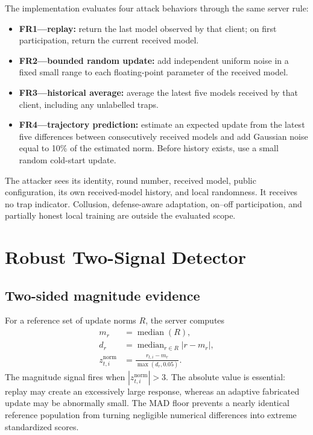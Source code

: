 The implementation evaluates four attack behaviors through the same server rule:
\begin{itemize}
    \item \textbf{FR1---replay:} return the last model observed by that client; on first participation, return the current received model.
    \item \textbf{FR2---bounded random update:} add independent uniform noise in a fixed small range to each floating-point parameter of the received model.
    \item \textbf{FR3---historical average:} average the latest five models received by that client, including any unlabelled traps.
    \item \textbf{FR4---trajectory prediction:} estimate an expected update from the latest five differences between consecutively received models and add Gaussian noise equal to 10\% of the estimated norm. Before history exists, use a small random cold-start update.
\end{itemize}
The attacker sees its identity, round number, received model, public configuration, its own received-model history, and local randomness. It receives no trap indicator. Collusion, defense-aware adaptation, on--off participation, and partially honest local training are outside the evaluated scope.

\section{Robust Two-Signal Detector}

\subsection{Two-sided magnitude evidence}
For a reference set of update norms $R$, the server computes
\begin{align}
m_r &= \operatorname{median}(R),\\
d_r &= \operatorname{median}_{r\in R}|r-m_r|,\\
z^{\mathrm{norm}}_{t,i} &= \frac{r_{t,i}-m_r}{\max(d_r,0.05)}.
\end{align}
The magnitude signal fires when $|z^{\mathrm{norm}}_{t,i}|>3$. The absolute value is essential: replay may create an excessively large response, whereas an adaptive fabricated update may be abnormally small. The MAD floor prevents a nearly identical reference population from turning negligible numerical differences into extreme standardized scores.

